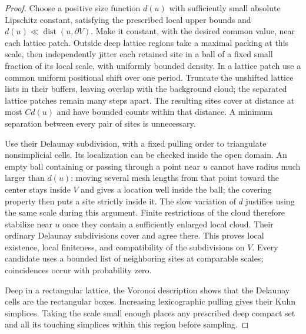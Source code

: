 \documentclass[11pt]{article}
\numberwithin{equation}{section}
\theoremstyle{definition}
\theoremstyle{remark}
\DeclareMathOperator{\dist}{dist}
\begin{document}
\begin{proof}
Choose a positive size function $d(u)$ with sufficiently small absolute
Lipschitz constant, satisfying the prescribed local upper bounds and
$d(u)\ll\dist(u,\partial V)$.  Make it constant, with the desired
common value, near each lattice patch.  Outside deep lattice regions
take a maximal packing at this scale, then independently jitter each
retained site in a ball of a fixed small fraction of its local scale,
with uniformly bounded density.  In a lattice patch use a common
uniform positional shift over one period.  Truncate the unshifted
lattice lists in their buffers, leaving overlap with the background
cloud; the separated lattice patches remain many steps apart.
The resulting sites cover at distance at most $Cd(u)$ and have
bounded counts within that distance.  A minimum separation between
every pair of sites is unnecessary.

Use their Delaunay subdivision, with a fixed pulling order to
triangulate nonsimplicial cells.  Its localization can be checked
inside the open domain.  An empty ball containing or passing through
a point near $u$ cannot have radius much larger than $d(u)$: moving
several mesh lengths from that point toward the center stays inside
$V$ and gives a location well inside the ball; the covering property
then puts a site strictly inside it.  The slow variation of $d$
justifies using the same scale during this argument.  Finite
restrictions of the cloud therefore stabilize near $u$ once they
contain a sufficiently enlarged local cloud.  Their ordinary Delaunay
subdivisions cover and agree there.  This proves local existence,
local finiteness, and compatibility of the subdivisions on $V$.
Every candidate uses a bounded list of neighboring sites at comparable
scales; coincidences occur with probability zero.

Deep in a rectangular lattice, the Voronoi description shows that the
Delaunay cells are the rectangular boxes.  Increasing lexicographic
pulling gives their Kuhn simplices.  Taking the scale small enough
places any prescribed deep compact set and all its touching simplices
within this region before sampling.


\end{proof}
\end{document}
